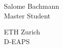 \documentclass[11pt,aspectratio=169]{beamer}
\begin{document}
\begin{closingframe}

Salome Bachmann\\
Master Student\\

\medskip

ETH Zurich\\
D-EAPS\\

\end{closingframe}



	


			
\end{document}
